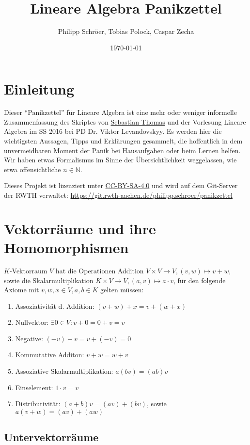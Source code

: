 \documentclass[11pt]{scrartcl}
\title{\textbf{Lineare Algebra Panikzettel}}
\author{Philipp Schröer, Tobias Polock, Caspar Zecha}
\date{\today}
\begin{document}
\maketitle

\section{Einleitung}

Dieser ``Panikzettel'' für Lineare Algebra ist eine mehr oder weniger informelle Zusammenfassung des Skriptes von \href{http://www.math.rwth-aachen.de/~Sebastian.Thomas/photo.jpg}{Sebastian Thomas} und der Vorlesung Lineare Algebra im SS 2016 bei PD Dr. Viktor Levandovskyy. Es werden hier die wichtigsten Aussagen, Tipps und Erklärungen gesammelt, die hoffentlich in dem unvermeidbaren Moment der Panik bei Hausaufgaben oder beim Lernen helfen. Wir haben etwas Formalismus im Sinne der Übersichtlichkeit weggelassen, wie etwa offensichtliche $n \in \mathbb{N}$.

Dieses Projekt ist lizenziert unter \href{https://creativecommons.org/licenses/by-sa/4.0/}{CC-BY-SA-4.0} und wird auf dem Git-Server der RWTH verwaltet: \url{https://git.rwth-aachen.de/philipp.schroer/panikzettel}

\section{Vektorräume und ihre Homomorphismen}

$K$-Vektorraum $V$ hat die Operationen Addition  $V \times V \to V, (v,w) \mapsto v+w$, sowie die Skalarmultiplikation $K \times V \to V, (a,v) \mapsto a \cdot v  $, für den folgende Axiome mit $v, w, x \in V, a,b \in K$ gelten müssen:

\begin{enumerate}
\item Assoziativität d. Addition: $(v+w)+x = v+(w+x)$
\item Nullvektor: $\exists 0 \in V: v+0=0+v=v$
\item Negative: $(-v)+v=v+(-v)=0$
\item Kommutative Additon: $v+w=w+v$
\item Assoziative Skalarmultiplikation: $a(bv)=(ab)v$
\item Einselement: $1\cdot v=v$
\item Distributivität: $(a+b)v=(av)+(bv)$, sowie $a(v+w)=(av)+(aw)$
\end{enumerate}

\subsection{Untervektorräume}
\end{document}
